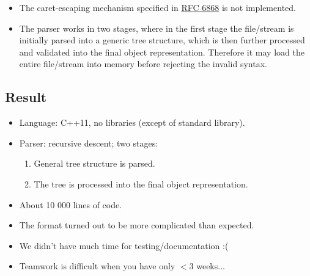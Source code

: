\documentclass[10pt,a4paper]{article}
\begin{document}
\begin{itemize}
	\item The caret-escaping mechanism specified in \hyperref{https://tools.ietf.org/html/rfc6868}{}{}{RFC 6868} is not implemented.
	\item The parser works in two stages, where in the first stage the file/stream is initially parsed into a generic tree structure, which is then further processed and validated into the final object representation. Therefore it may load the entire file/stream into memory before rejecting the invalid syntax.                                                                                                                                              \end{itemize}

\subsection*{Result}
\begin{itemize}
	\item Language: C++11, no libraries (except of standard library).
	\item Parser: recursive descent; two stages:
	\begin{enumerate}
		\item General tree structure is parsed.
		\item The tree is processed into the final object representation.
	\end{enumerate}
	\item About 10 000 lines of code.
	\item The format turned out to be more complicated than expected.
	\item We didn't have much time for testing/documentation :(
	\item Teamwork is difficult when you have only $< 3$ weeks...
\end{itemize}
\end{document}
